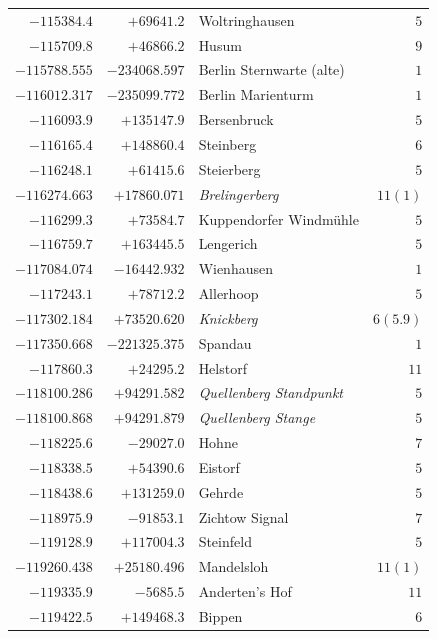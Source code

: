 \begin{center}
\begin{tabular}{r|r|p{170pt}|r}
\(-115384.4\)&\(+69641.2\)&Woltringhausen&\(5\)\\
\(-115709.8\)&\(+46866.2\)&Husum&\(9\)\\
\(-115788.555\)&\(-234068.597\)&Berlin Sternwarte (alte)&\(1\)\\
\(-116012.317\)&\(-235099.772\)&Berlin Marienturm&\(1\)\\
\(-116093.9\)&\(+135147.9\)&Bersenbruck&\(5\)\\
\(-116165.4\)&\(+148860.4\)&Steinberg&\(6\)\\
\(-116248.1\)&\(+61415.6\)&Steierberg&\(5\)\\
\(-116274.663\)&\(+17860.071\)&\textit{Brelingerberg}&\(11 (1)\)\\
\(-116299.3\)&\(+73584.7\)&Kuppendorfer Windmühle&\(5\)\\
\(-116759.7\)&\(+163445.5\)&Lengerich&\(5\)\\
\(-117084.074\)&\(-16442.932\)&Wienhausen&\(1\)\\
\(-117243.1\)&\(+78712.2\)&Allerhoop&\(5\)\\
\(-117302.184\)&\(+73520.620\)&\textit{Knickberg}&\(6(5.9)\)\\
\(-117350.668\)&\(-221325.375\)&Spandau&\(1\)\\
\(-117860.3\)&\(+24295.2\)&Helstorf&\(11\)\\
\(-118100.286\)&\(+94291.582\)&\textit{Quellenberg Standpunkt}&\(5\)\\
\(-118100.868\)&\(+94291.879\)&\textit{Quellenberg Stange}&\(5\)\\
\(-118225.6\)&\(-29027.0\)&Hohne&\(7\)\\
\(-118338.5\)&\(+54390.6\)&Eistorf&\(5\)\\
\(-118438.6\)&\(+131259.0\)&Gehrde&\(5\)\\
\(-118975.9\)&\(-91853.1\)&Zichtow Signal&\(7\)\\
\(-119128.9\)&\(+117004.3\)&Steinfeld&\(5\)\\
\(-119260.438\)&\(+25180.496\)&Mandelsloh&\(11 (1)\)\\
\(-119335.9\)&\(-5685.5\)&Anderten’s Hof&\(11\)\\
\(-119422.5\)&\(+149468.3\)&Bippen&\(6\)\\
\hline\end{tabular}\endgroup\end{center}
\clearpage
